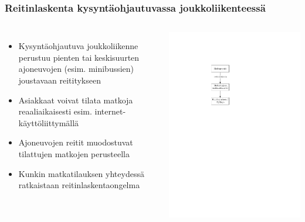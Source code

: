 \documentclass{beamer}
\begin{document}
\begin{frame}
  \frametitle{Reitinlaskenta kysyntäohjautuvassa joukkoliikenteessä}   %
  \begin{columns}[c]
  \column{3.5in}  %
  \begin{itemize}
    \item 
    Kysyntäohjautuva joukkoliikenne perustuu pienten tai keskisuurten ajoneuvojen (esim. minibussien) joustavaan reititykseen 
    \item
    Asiakkaat voivat tilata matkoja reaaliaikaisesti esim. internet-käyttöliittymällä
    \item
    Ajoneuvojen reitit muodostuvat tilattujen matkojen perusteella
    \item
    Kunkin matkatilauksen yhteydessä ratkaistaan reitinlaskentaongelma
  \end{itemize}
    \column{1.5in}
\centering

\includegraphics[scale=0.8]{tilauskaavio02}
 
  \end{columns}
\end{frame}
\end{document}
